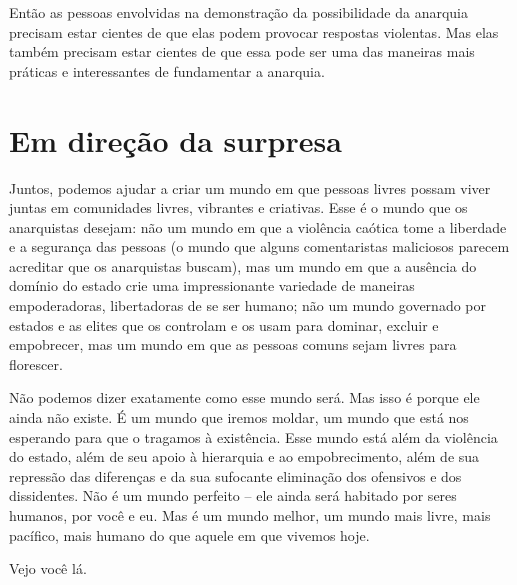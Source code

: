 Então as pessoas envolvidas na demonstração da possibilidade da anarquia precisam estar cientes de que elas podem provocar respostas violentas. Mas elas também precisam estar cientes de que essa pode ser uma das maneiras mais práticas e interessantes de fundamentar a anarquia.

\section{Em direção da surpresa}

Juntos, podemos ajudar a criar um mundo em que pessoas livres possam viver juntas em comunidades livres, vibrantes e criativas. Esse é o mundo que os anarquistas desejam: não um mundo em que a violência caótica tome a liberdade e a segurança das pessoas (o mundo que alguns comentaristas maliciosos parecem acreditar que os anarquistas buscam), mas um mundo em que a ausência do domínio do estado crie uma impressionante variedade de maneiras empoderadoras, libertadoras de se ser humano; não um mundo governado por estados e as elites que os controlam e os usam para dominar, excluir e empobrecer, mas um mundo em que as pessoas comuns sejam livres para florescer.

Não podemos dizer exatamente como esse mundo será. Mas isso é porque ele ainda não existe. É um mundo que iremos moldar, um mundo que está nos esperando para que o tragamos à existência. Esse mundo está além da violência do estado, além de seu apoio à hierarquia e ao empobrecimento, além de sua repressão das diferenças e da sua sufocante eliminação dos ofensivos e dos dissidentes. Não é um mundo perfeito -- ele ainda será habitado por seres humanos, por você e eu. Mas é um mundo melhor, um mundo mais livre, mais pacífico, mais humano do que aquele em que vivemos hoje.

Vejo você lá.